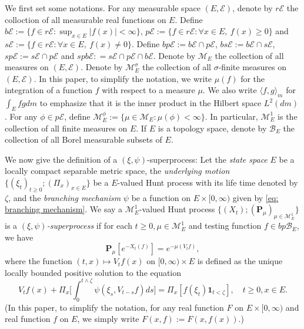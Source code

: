 \documentclass[12pt, a4paper]{amsart}
\theoremstyle{definition}
\numberwithin{equation}{section}
\begin{document}
	We first set some notations.
	For any measurable space $(E,\mathscr E)$, denote by $r\mathscr E$ the colloction of all measurable real functions on $E$.
	Define $b\mathscr E :=\{f \in r\mathscr E: \sup_{x\in E}|f(x)|<\infty \}$, $p\mathscr E :=\{f\in r\mathscr E: \forall x\in E,~f(x)\geq 0\}$ and $s\mathscr E :=\{f\in r\mathscr E: \forall x\in E,~f(x)\neq 0\}$.
	Define $bp\mathscr E := b\mathscr E \cap p\mathscr E$, $bs\mathscr E:= b\mathscr E \cap s\mathscr E$, $sp\mathscr E:= s\mathscr E \cap p\mathscr E$ and $spb\mathscr E : = s\mathscr E \cap p\mathscr E \cap b\mathscr E$.	
	Denote by $\mathcal M_E$ the collection of all measures on $(E,\mathscr E)$.
	Denote by $\mathcal M^\sigma_E$ the collection of all  $\sigma$-finite measures on $(E,\mathscr E)$.
	In this paper, to simplify the notation, we write $\mu(f)$ for the integration of a function $f$ with respect to a measure $\mu$.
    We also write $\langle f, g\rangle_m$ for $\int_E fg dm$  
    to emphasize that it is the inner product in the Hilbert space $L^2(dm)$.
	For any $\phi \in p\mathscr E$, define $\mathcal M^\phi_E:= \{\mu \in \mathcal M_E: \mu(\phi) < \infty\}$.
	In particular, $\mathcal M^1_E$ is the collection of all  finite measures on $E$.
	If $E$ is a topology space, denote by $\mathscr B_E$ the collection of all  Borel measurable subsets of $E$.
	
	We now give the definition of a $(\xi, \psi)$-superprocess:
	Let the \emph{state space} $E$ be a locally compact separable metric space,
	the \emph{underlying motion} $\{(\xi_t)_{t\geq 0};(\Pi_x)_{x\in E}\}$ be a $E$-valued Hunt process with its life time denoted by $\zeta$, and the \emph{branching mechanism} $\psi$ 
be a function on $E\times[0,\infty)$ given by
	\eqref{eq: branching mechanism}.
	We say a $\mathcal M^1_E$-valued Hunt process $\{(X_t); (\mathbf P_\mu)_{\mu \in \mathcal M^1_E}\}$ is a \emph{$(\xi,\psi)$-superprocess} if for each $t\geq 0, \mu \in \mathcal M_E^1$ and  testing function $f\in bp\mathscr B_E$, we have
\[
	\mathbf P_\mu [e^{-X_t(f)}] = e^{-\mu(V_tf)},
\]
	where the function $(t,x) \mapsto V_tf(x)$ on $[0,\infty) \times E$ is defined as the unique locally bounded positive solution to the equation
\[\label{eq:FKPP_in_definition}
	V_t f(x) + \Pi_x \Big[  \int_0^{t\wedge \zeta} \psi (\xi_s,V_{t-s} f) ds \Big]
	=\Pi_x [ f(\xi_t)\mathbf 1_{t<\zeta} ],\quad
	t\geq 0, x \in E.
\]
	(In this paper, to simplify the notation, for any real function $F$ on $E\times [0,\infty)$ and real function $f$ on $E$, we simply write $F(x,f):= F(x,f(x)).$)
\end{document}
